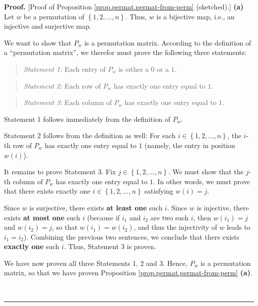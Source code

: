 \documentclass[numbers=enddot,12pt,final,onecolumn,notitlepage]{scrartcl}%
\theoremstyle{definition}
\newenvironment{statement}{\begin{quote}}{\end{quote}}
\newenvironment{proof}[1][Proof]{\noindent\textbf{#1.} }{\ \rule{0.5em}{0.5em}}
\begin{document}
\begin{proof}
[Proof of Proposition \ref{prop.permat.permat-from-perm} (sketched).]%
\textbf{(a)} Let $w$ be a permutation of $\left\{  1,2,\ldots,n\right\}  $.
Thus, $w$ is a bijective map, i.e., an injective and surjective map.

We want to show that $P_{w}$ is a permutation matrix. According to the
definition of a \textquotedblleft permutation matrix\textquotedblright, we
therefor must prove the following three statements:

\begin{statement}
\textit{Statement 1:} Each entry of $P_{w}$ is either a $0$ or a $1$.
\end{statement}

\begin{statement}
\textit{Statement 2:} Each row of $P_{w}$ has exactly one entry equal to $1$.
\end{statement}

\begin{statement}
\textit{Statement 3:} Each column of $P_{w}$ has exactly one entry equal to
$1$.
\end{statement}

Statement 1 follows immediately from the definition of $P_{w}$.

Statement 2 follows from the definition as well: For each $i\in\left\{
1,2,\ldots,n\right\}  $, the $i$-th row of $P_{w}$ has exactly one entry equal
to $1$ (namely, the entry in position $w\left(  i\right)  $).

It remains to prove Statement 3. Fix $j\in\left\{  1,2,\ldots,n\right\}  $. We
must show that the $j$-th column of $P_{w}$ has exactly one entry equal to
$1$. In other words, we must prove that there exists exactly one $i\in\left\{
1,2,\ldots,n\right\}  $ satisfying $w\left(  i\right)  =j$.

Since $w$ is surjective, there exists \textbf{at least one} such $i$. Since
$w$ is injective, there exists \textbf{at most one} such $i$ (because if
$i_{1}$ and $i_{2}$ are two such $i$, then $w\left(  i_{1}\right)  =j$ and
$w\left(  i_{2}\right)  =j$, so that $w\left(  i_{1}\right)  =w\left(
i_{2}\right)  $, and thus the injectivity of $w$ leads to $i_{1}=i_{2}$).
Combining the previous two sentences, we conclude that there exists
\textbf{exactly one} such $i$. Thus, Statement 3 is proven.

We have now proven all three Statements 1, 2 and 3. Hence, $P_{w}$ is a
permutation matrix, so that we have proven Proposition
\ref{prop.permat.permat-from-perm} \textbf{(a)}.


\end{proof}
\end{document}
